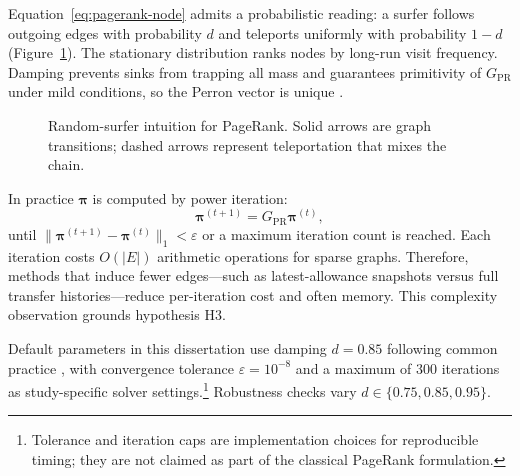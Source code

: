 
Equation~\eqref{eq:pagerank-node} admits a probabilistic reading: a surfer follows outgoing edges with probability $d$ and teleports uniformly with probability $1-d$ (Figure~\ref{fig:random-surfer}). The stationary distribution ranks nodes by long-run visit frequency. Damping prevents sinks from trapping all mass and guarantees primitivity of $G_{\mathrm{PR}}$ under mild conditions, so the Perron vector is unique .

\begin{figure}[htbp]
\centering
{}
\caption{Random-surfer intuition for PageRank. Solid arrows are graph transitions; dashed arrows represent teleportation that mixes the chain.}
\label{fig:random-surfer}
\end{figure}


In practice $\boldsymbol{\pi}$ is computed by power iteration:
\begin{equation}
\boldsymbol{\pi}^{(t+1)} = G_{\mathrm{PR}}\boldsymbol{\pi}^{(t)},
\label{eq:power-iteration}
\end{equation}
until $\|\boldsymbol{\pi}^{(t+1)}-\boldsymbol{\pi}^{(t)}\|_1 < \varepsilon$ or a maximum iteration count is reached. Each iteration costs $O(|E|)$ arithmetic operations for sparse graphs. Therefore, methods that induce fewer edges---such as latest-allowance snapshots versus full transfer histories---reduce per-iteration cost and often memory. This complexity observation grounds hypothesis H3.

Default parameters in this dissertation use damping $d=0.85$ following common practice , with convergence tolerance $\varepsilon=10^{-8}$ and a maximum of $300$ iterations as study-specific solver settings.\footnote{Tolerance and iteration caps are implementation choices for reproducible timing; they are not claimed as part of the classical PageRank formulation.} Robustness checks vary $d\in\{0.75,0.85,0.95\}$.

